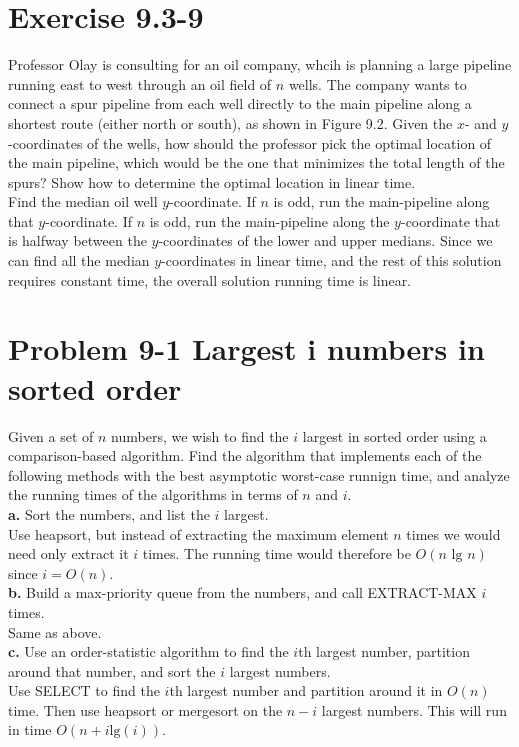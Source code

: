 \documentclass[10pt,a4paper]{article}
\begin{document}
\section*{Exercise 9.3-9}
Professor Olay is consulting for an oil company, whcih is planning a large pipeline running east to west through an oil field of $n$ wells. The company wants to connect a spur pipeline from each well directly to the main pipeline along a shortest route (either north or south), as shown in Figure 9.2. Given the $x$- and $y$-coordinates of the wells, how should the professor pick the optimal location of the main pipeline, which would be the one that minimizes the total length of the spurs? Show how to determine the optimal location in linear time.
\vspace*{\baselineskip}
\\
Find the median oil well $y$-coordinate. If $n$ is odd, run the main-pipeline along that $y$-coordinate. If $n$ is odd, run the main-pipeline along the $y$-coordinate that is halfway between the $y$-coordinates of the lower and upper medians. Since we can find all the median $y$-coordinates in linear time, and the rest of this solution requires constant time, the overall solution running time is linear.

\section*{Problem 9-1 Largest i numbers in sorted order}
Given a set of $n$ numbers, we wish to find the $i$ largest in sorted order using a comparison-based algorithm. Find the algorithm that implements each of the following methods with the best asymptotic worst-case runnign time, and analyze the running times of the algorithms in terms of $n$ and $i$.
\vspace*{\baselineskip}
\\
\textbf{a.} Sort the numbers, and list the $i$ largest.
\vspace*{\baselineskip}
\\
Use heapsort, but instead of extracting the maximum element $n$ times we would need only extract it $i$ times. The running time would therefore be $O(n\text{ lg }n)$ since $i=O(n)$.
\vspace*{\baselineskip}
\\
\textbf{b.} Build a max-priority queue from the numbers, and call EXTRACT-MAX $i$ times.
\vspace*{\baselineskip}
\\
Same as above.
\vspace*{\baselineskip}
\\
\textbf{c.} Use an order-statistic algorithm to find the $i$th largest number, partition around that number, and sort the $i$ largest numbers.
\vspace*{\baselineskip}
\\
Use SELECT to find the $i$th largest number and partition around it in $O(n)$ time. Then use heapsort or mergesort on the $n-i$ largest numbers. This will run in time $O(n + i\text{lg}(i))$.
\end{document}
